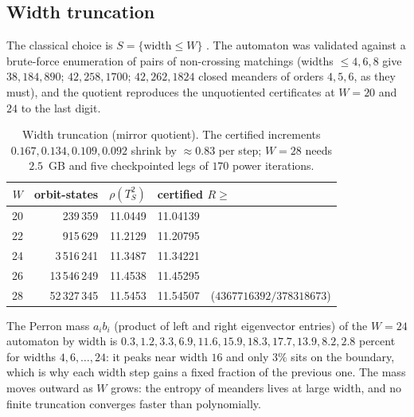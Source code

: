 \documentclass[11pt]{amsart}
\theoremstyle{definition}
\begin{document}
\subsection{Width truncation}\label{sub:width}
The classical choice is $S=\{\text{width}\le W\}$ \cite{Jensen2000}. The automaton was validated against a brute-force enumeration of pairs of non-crossing matchings (widths $\le4,6,8$ give $38,184,890$; $42,258,1700$; $42,262,1824$ closed meanders of orders $4,5,6$, as they must), and the quotient reproduces the unquotiented certificates at $W=20$ and $24$ to the last digit.

\begin{table}[h]
\centering
\begin{tabular}{rrrl}
\toprule
$W$ & orbit-states & $\rho(T_S^2)$ & certified $R\ge$\\
\midrule
20 & 239\,359 & 11.0449 & 11.04139\\
22 & 915\,629 & 11.2129 & 11.20795\\
24 & 3\,516\,241 & 11.3487 & 11.34221\\
26 & 13\,546\,249 & 11.4538 & 11.45295\\
28 & 52\,327\,345 & 11.5453 & 11.54507\ \ ($4367716392/378318673$)\\
\bottomrule
\end{tabular}
\caption{Width truncation (mirror quotient). The certified increments $0.167,0.134,0.109,0.092$ shrink by $\approx0.83$ per step; $W=28$ needs $2.5$~GB and five checkpointed legs of $170$ power iterations.}\label{tab:width}
\end{table}

The Perron mass $a_ib_i$ (product of left and right eigenvector entries) of the $W=24$ automaton by width is $0.3,1.2,3.3,6.9,11.6,15.9,18.3,17.7,13.9,8.2,2.8$ percent for widths $4,6,\dots,24$: it peaks near width $16$ and only $3\%$ sits on the boundary, which is why each width step gains a fixed fraction of the previous one. The mass moves outward as $W$ grows: the entropy of meanders lives at large width, and no finite truncation converges faster than polynomially.
\end{document}
